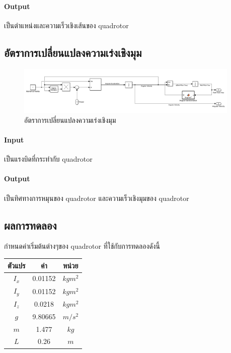 \paragraph*{Output}
เป็นตำแหน่งและความเร็วเชิงเส้นของ quadrotor
\vspace{15pt}
\subsection{อัตราการเปลี่ยนแปลงความเร่งเชิงมุม}
\begin{figure}[!ht]
	\centering
	\includegraphics[width=0.95\textwidth]{images/simulink/angular_acce.png}
	\caption{อัตราการเปลี่ยนแปลงความเร่งเชิงมุม}
\end{figure}
\vspace{-10pt}
\paragraph*{Input}
เป็นแรงบิดที่กระทำกับ quadrotor
\paragraph*{Output}
เป็นทิศทางการหมุนของ quadrotor และความเร็วเชิงมุมของ quadrotor

\clearpage
\subsection{ผลการทดลอง}
กำหนดค่าเริ่มต้นต่างๆของ quadrotor ที่ใช้กับการทดลองดังนี้


\begin{center}
    \begin{tabular}{ | c | c | c | } 
    \hline
    ตัวแปร & ค่า & หน่วย \\ 
    \hline
    \hline
    $I_x$ & 0.01152 & $kgm^2$ \\ 
    \hline
    $I_y$ & 0.01152 & $kgm^2$ \\
    \hline
    $I_z$ & 0.0218 & $kgm^2$ \\
    \hline
    $g$ & 9.80665 & $m/s^2$ \\
    \hline
    $m$ & 1.477 & $kg$ \\
    \hline
    $L$ & 0.26 & $m$ \\
    \hline
    \end{tabular}
\end{center}

